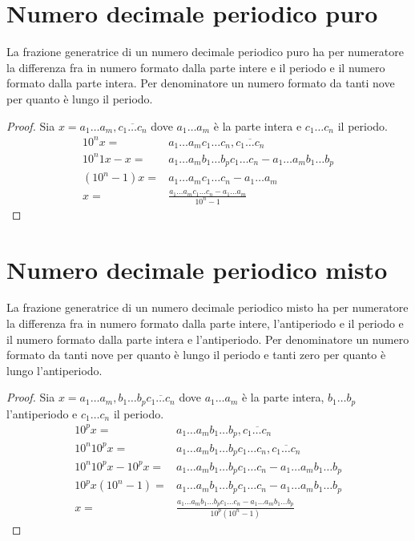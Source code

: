 \section{Numero decimale periodico puro}\label{sec:numerodecimaleperiodico-puro}
\begin{thm}
	La frazione generatrice di un numero decimale periodico puro ha per numeratore la differenza fra in numero formato dalla parte intere e il periodo e il numero formato dalla parte intera. Per denominatore un numero formato da tanti nove per quanto è lungo il periodo.  
\end{thm}
\begin{proof}
	Sia $x=a_1\dots a_m,\overline{c_1\dots c_n}$ dove $a_1\dots a_m$ è la parte intera e $c_1\dots c_n$ il periodo. 
	\begin{align*}
	10^nx=&a_1\dots a_m c_1\dots c_n,\overline{c_1\dots c_n}\\
	10^n1x-x=&a_1\dots a_m b_1\dots b_p c_1\dots c_n-a_1\dots a_m b_1\dots b_p\\
	(10^n-1)x=&a_1\dots a_m c_1\dots c_n-a_1\dots a_m\\
	x=&\frac{a_1\dots a_m c_1\dots c_n-a_1\dots a_m}{10^n-1}
	\end{align*}
\end{proof}
\section{Numero decimale periodico misto}\label{sec:numero-decimale-periodico-misto}
\begin{thm}\label{thm:Numero-decimale-periodico-misto}
La frazione generatrice di un numero decimale periodico misto ha per numeratore la differenza fra in numero formato dalla parte intere, l'antiperiodo e il periodo e il numero formato dalla parte intera e l'antiperiodo. Per denominatore un numero formato da tanti nove per quanto è lungo il periodo e tanti zero per quanto è lungo l'antiperiodo.  
\end{thm}
\begin{proof}
	Sia $x=a_1\dots a_m,b_1\dots b_p \overline{c_1\dots c_n}$ dove $a_1\dots a_m$ è la parte intera, $b_1\dots b_p$ l'antiperiodo e $c_1\dots c_n$ il periodo. 
	\begin{align*}
	10^px=&a_1\dots a_m b_1\dots b_p,\overline{c_1\dots c_n}\\
	10^n10^px=&a_1\dots a_m b_1\dots b_p c_1\dots c_n,\overline{c_1\dots c_n}\\
	10^n10^px-10^px=&a_1\dots a_m b_1\dots b_p c_1\dots c_n-a_1\dots a_m b_1\dots b_p\\
	10^px(10^n-1)=&a_1\dots a_m b_1\dots b_p c_1\dots c_n-a_1\dots a_m b_1\dots b_p\\
	x=&\frac{a_1\dots a_m b_1\dots b_p c_1\dots c_n-a_1\dots a_m b_1\dots b_p}{10^p(10^n-1)}
	\end{align*}
\end{proof}